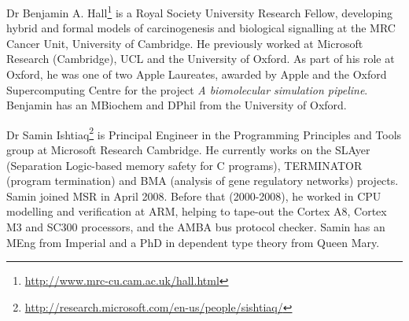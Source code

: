 \documentclass[a4paper,11pt]{article}
\begin{document}
Dr Benjamin A. Hall\footnote{\url{http://www.mrc-cu.cam.ac.uk/hall.html}}
is a Royal Society University Research Fellow, developing hybrid and
formal models of carcinogenesis and biological signalling at the MRC
Cancer Unit, University of Cambridge. He previously worked at
Microsoft Research (Cambridge), UCL and the University of Oxford. As
part of his role at Oxford, he was one of two Apple
Laureates, awarded by Apple and the Oxford Supercomputing Centre for
the project {\emph{A biomolecular simulation pipeline}}. Benjamin has an
MBiochem and DPhil from the University of Oxford.

Dr Samin
Ishtiaq\footnote{\url{http://research.microsoft.com/en-us/people/sishtiaq/}}
is Principal Engineer in the Programming Principles and Tools group at
Microsoft Research Cambridge. He currently works on the SLAyer
(Separation Logic-based memory safety for C programs), TERMINATOR
(program termination) and BMA (analysis of gene regulatory networks)
projects. Samin joined MSR in April 2008. Before that (2000-2008), he
worked in CPU modelling and verification at ARM, helping to tape-out
the Cortex A8, Cortex M3 and SC300 processors, and the AMBA bus
protocol checker. Samin has an MEng from Imperial and a PhD in
dependent type theory from Queen Mary.



\end{document}
